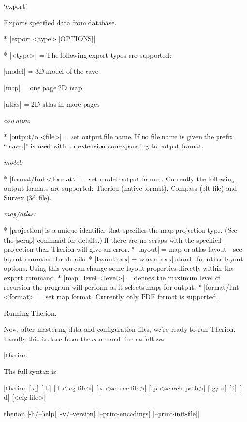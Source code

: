 \subsubchapter `export'.

\description
  Exports specified data from database. 
\enddescription

\syntax
  \list
    * |export <type> [OPTIONS]| 
  \endlist
\endsyntax

\arguments
  * |<type>| = The following export types are supported:

    |model| = 3D model of the cave

    |map| = one page 2D map

    |atlas| = 2D atlas in more pages
\endarguments

\options
  {\it common:}

  * |output/o <file>| = set output file name. If no file name is
    given the prefix ``|cave.|'' is used with an extension corresponding to
    output format.

  {\it model:}

  * |format/fmt <format>| = set model output format. Currently the following
    output formats are supported: Therion (native format), Compass 
    (plt file) and Survex (3d file).

  {\it map/atlas:}
  
  * |projection| is a unique identifier that specifies the map projection type.
    (See the |scrap| command for details.) If there are no scraps with 
    the specified projection then Therion will give an error. 
  * |layout| = map or atlas layout---see layout command for details.
  * |layout-xxx| = where |xxx| stands for other layout options. Using this
    you can change some layout properties directly within the export command.
  * |map_level <level>| = defines the maximum level of recursion the program 
     will perform as it selects maps for output.
  * |format/fmt <format>| = set map format. Currently only PDF format
    is supported.
\endoptions



\subchapter Running Therion.

Now, after mastering data and configuration files, we're ready to run Therion. 
Usually this is done from the command line as follows

|therion|

The full syntax is

|therion [-q] [-L] [-l <log-file>]
        [-s <source-file>] [-p <search-path>]
        [-g/-u] [-i] [-d] [<cfg-file>]

therion [-h/--help]
        [-v/--version]
        [--print-encodings]
        [--print-init-file]|


